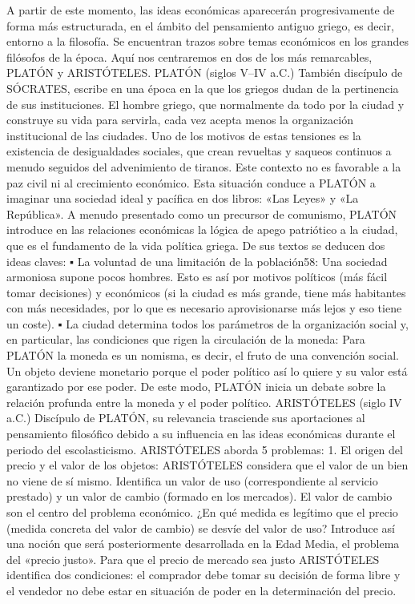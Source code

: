 \documentclass[10pt,a4paper]{article}
\begin{document}
A partir de este momento, las ideas económicas aparecerán progresivamente de forma más estructurada, en el ámbito del pensamiento antiguo griego, es decir, entorno a la filosofía. Se encuentran trazos sobre temas económicos en los grandes filósofos de la época. Aquí nos centraremos en dos de los más remarcables, PLATÓN y ARISTÓTELES.
PLATÓN (siglos V–IV a.C.)
También discípulo de SÓCRATES, escribe en una época en la que los griegos dudan de la pertinencia de sus instituciones. El hombre griego, que normalmente da todo por la ciudad y construye su vida para servirla, cada vez acepta menos la organización institucional de las ciudades. Uno de los motivos de estas tensiones es la existencia de desigualdades sociales, que crean revueltas y saqueos continuos a menudo seguidos del advenimiento de tiranos. Este contexto no es favorable a la paz civil ni al crecimiento económico.
Esta situación conduce a PLATÓN a imaginar una sociedad ideal y pacífica en dos libros: «Las Leyes» y «La República». A menudo presentado como un precursor de comunismo, PLATÓN introduce en las relaciones económicas la lógica de apego patriótico a la ciudad, que es el fundamento de la vida política griega. De sus textos se deducen dos ideas claves:
▪
La voluntad de una limitación de la población58: Una sociedad armoniosa supone pocos hombres. Esto es así por motivos políticos (más fácil tomar decisiones) y económicos (si la ciudad es más grande, tiene más habitantes con más necesidades, por lo que es necesario aprovisionarse más lejos y eso tiene un coste).
▪
La ciudad determina todos los parámetros de la organización social y, en particular, las condiciones que rigen la circulación de la moneda: Para PLATÓN la moneda es un nomisma, es decir, el fruto de una convención social. Un objeto deviene monetario porque el poder político así lo quiere y su valor está garantizado por ese poder. De este modo, PLATÓN inicia un debate sobre la relación profunda entre la moneda y el poder político.
ARISTÓTELES (siglo IV a.C.)
Discípulo de PLATÓN, su relevancia trasciende sus aportaciones al pensamiento filosófico debido a su influencia en las ideas económicas durante el periodo del escolasticismo.
ARISTÓTELES aborda 5 problemas:
1.
El origen del precio y el valor de los objetos: ARISTÓTELES considera que el valor de un bien no viene de sí mismo. Identifica un valor de uso (correspondiente al servicio prestado) y un valor de cambio (formado en los mercados). El valor de cambio son el centro del problema económico. ¿En qué medida es legítimo que el precio (medida concreta del valor de cambio) se desvíe del valor de uso? Introduce así una noción que será posteriormente desarrollada en la Edad Media, el problema del «precio justo». Para que el precio de mercado sea justo ARISTÓTELES identifica dos condiciones: el comprador debe tomar su decisión de forma libre y el vendedor no debe estar en situación de poder en la determinación del precio.
\end{document}
